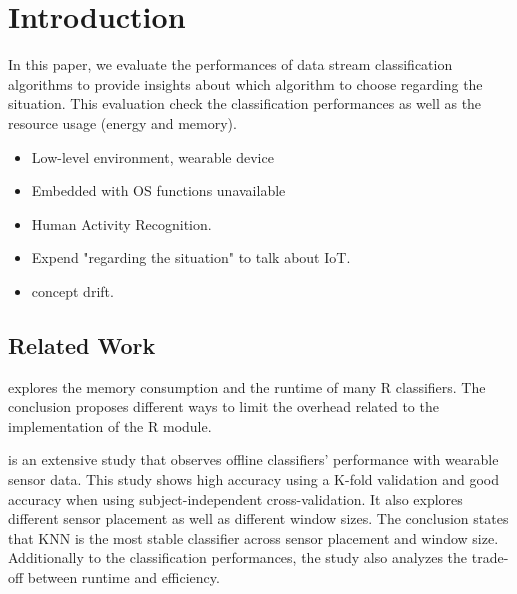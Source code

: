 \section{Introduction}
\label{sec:introduction}

In this paper, we evaluate the performances of
data stream classification algorithms to provide
insights about which algorithm to choose regarding
the situation.
This evaluation check the classification
performances as well as the resource usage (energy
and memory).

\begin{itemize}
		\item Low-level environment, wearable device
		\item Embedded with OS functions unavailable
		\item Human Activity Recognition.
		\item Expend "regarding the situation" to talk about IoT.
		\item concept drift.
\end{itemize}




\subsection{Related Work}
\cite{memory_consumption_machine_learning}
explores the memory consumption and
the runtime of many R classifiers. The conclusion proposes different ways to
limit the overhead related to the implementation of the R module.

\cite{Janidarmian_2017} is an extensive study that
observes offline classifiers'
performance with wearable sensor data. This study shows high accuracy using a
K-fold validation and good accuracy when using subject-independent
cross-validation. It also explores different sensor placement as well as
different window sizes. The conclusion states that KNN is the most stable
classifier across sensor placement and window
size. Additionally to the
classification performances, the study also analyzes the trade-off between
runtime and efficiency.

